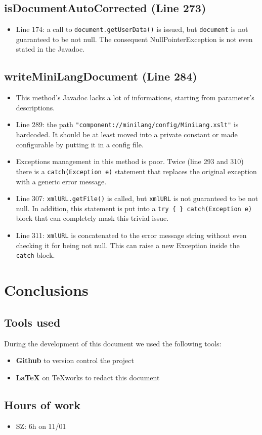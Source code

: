\documentclass[11pt]{article} %
\begin{document}
\subsection{isDocumentAutoCorrected (Line 273)}
\begin{itemize}
	\item Line 174: a call to \texttt{document.getUserData()} is issued, but \texttt{document} is not guaranteed to be not null. The consequent NullPointerException is not even stated in the Javadoc.
\end{itemize}

\subsection{writeMiniLangDocument (Line 284)}
\begin{itemize}
	\item This method's Javadoc lacks a lot of informations, starting from parameter's descriptions.
	\item Line 289: the path \texttt{"component://minilang/config/MiniLang.xslt"} is hardcoded. It should be at least moved into a private constant or made configurable by putting it in a config file.
	\item Exceptions management in this method is poor. Twice (line 293 and 310) there is a \texttt{catch(Exception e)} statement that replaces the original exception with a generic error message.
	\item Line 307: \texttt{xmlURL.getFile()} is called, but \texttt{xmlURL} is not guaranteed to be not null. In addition, this statement is put into a \texttt{try \{ \} catch(Exception e)} block that can completely mask this trivial issue.
	\item Line 311: \texttt{xmlURL} is concatenated to the error message string without even checking it for being not null. This can raise a new Exception inside the \texttt{catch} block.
\end{itemize}





\section{Conclusions}

\subsection{Tools used}
During the development of this document we used the following tools:
\begin{itemize}
	\item \textbf{Github} to version control the project
	\item \textbf{\LaTeX} on TeXworks to redact this document
\end{itemize}

\subsection{Hours of work}
\begin{itemize}
	\item SZ: 6h on 11/01
\end{itemize}
\end{document}
